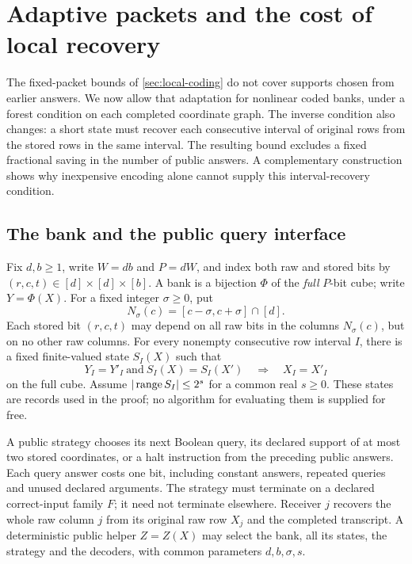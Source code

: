 \section{Adaptive packets and the cost of local recovery}\label{sec:adaptive-coded-bank}

The fixed-packet bounds of \cref{sec:local-coding} do not cover supports chosen
from earlier answers. We now allow that adaptation for nonlinear coded banks,
under a forest condition on each completed coordinate graph. The inverse
condition also changes: a short state must recover each consecutive interval
of original rows from the stored rows in the same interval. The resulting
bound excludes a fixed fractional saving in the number of public answers.
A complementary construction shows why inexpensive encoding alone cannot
supply this interval-recovery condition.

\subsection{The bank and the public query interface}

Fix $d,b\ge1$, write $W=db$ and $P=dW$, and index both raw and stored bits
by $(r,c,t)\in[d]\times[d]\times[b]$. A bank is a bijection $\Phi$ of the
\emph{full} $P$-bit cube; write $Y=\Phi(X)$. For a fixed integer $\sigma\ge0$,
put
\[
 N_\sigma(c)=[c-\sigma,c+\sigma]\cap[d].
\]
Each stored bit $(r,c,t)$ may depend on all raw bits in the columns
$N_\sigma(c)$, but on no other raw columns. For every nonempty consecutive
row interval $I$, there is a fixed finite-valued state $S_I(X)$ such that
\begin{equation}\label{eq:gap-bank-recovery}
 Y_I=Y'_I\ \text{and}\ S_I(X)=S_I(X')
 \quad\Longrightarrow\quad X_I=X'_I
\end{equation}
on the full cube. Assume $|\operatorname{range} S_I|\le2^s$ for a common real $s\ge0$.
These states are records used in the proof; no algorithm for evaluating them
is supplied for free.

A public strategy chooses its next Boolean query, its declared support of
at most two stored coordinates, or a halt instruction from the preceding
public answers. Each query answer costs one bit, including constant answers,
repeated queries and unused declared arguments. The strategy must terminate
on a declared correct-input family $F$; it need not terminate elsewhere.
Receiver $j$ recovers the whole raw column $j$ from its original raw row
$X_j$ and the completed transcript. A deterministic public helper $Z=Z(X)$
may select the bank, all its states, the strategy and the decoders, with
common parameters $d,b,\sigma,s$.

